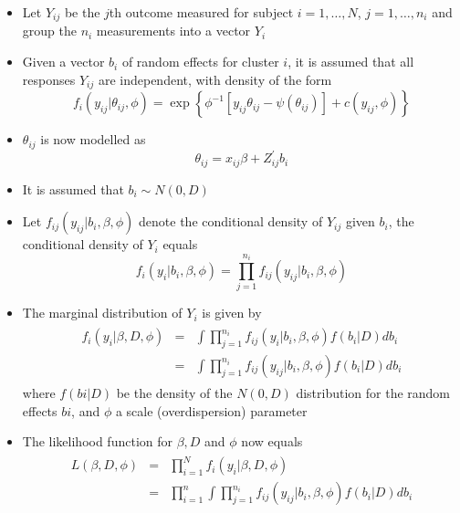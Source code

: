 \documentclass{beamer}
\begin{document}
\begin{frame}
\begin{itemize}
\item Let $Y_{ij}$ be the $j$th outcome measured for subject $i=1, \ldots, N$,   $j=1, \ldots, n_i$ and group the $n_i$ measurements into a vector $Y_i$
\item Given a vector $b_i$ of random effects for cluster $i$, it is assumed that all responses $Y_{ij}$ are independent, with density of the form
\begin{equation}
f_i(y_{ij}| \theta_{ij}, \phi)=\exp\left\{\phi^{-1}[y_{ij} \theta_{ij} -\psi(\theta_{ij})]+c(y_{ij},\phi) \right\}\nonumber
\end{equation}
\item $\theta_{ij}$ is now modelled as 
\[\theta_{ij}=x_{ij}\beta + Z^{'}_{ij}b_i \]
\item It is assumed that $b_i\sim N(0, D)$
\end{itemize}
\end{frame}

\begin{frame}
\begin{itemize}
\item Let $f_{ij}(y_{ij}|b_i,\beta,\phi)$ denote the conditional density of $Y_{ij}$ given $b_i$, the conditional density of $Y_i$ equals 
\[f_{i}(y_{i}|b_i,\beta,\phi)=\prod_{j=1}^{n_i}f_{ij}(y_{ij}|b_i,\beta,\phi) \]
\item The marginal distribution of $Y_i$ is given by
\begin{eqnarray*}
	\begin{array}{lll}
f_i(y_i|\beta,D,\phi)&=&\int\prod_{j=1}^{n_i}f_{ij}(y_i|b_i,\beta,\phi)f(b_i|D)db_i\\
                     &=&\int\prod_{j=1}^{n_i}f_{ij}(y_{ij}|b_i,\beta,\phi)f(b_i|D)db_i
\end{array}
\end{eqnarray*}
where $f(bi | D)$ be the density of the $N(0, D)$ distribution for the random effects $bi$, and $\phi$ a scale (overdispersion) parameter
\item The likelihood function for $\beta, D$ and $\phi$ now equals
\begin{eqnarray*}
	\begin{array}{lll}
		L(\beta,D,\phi)&=&\prod_{i=1}^{N}f_i(y_i|\beta,D,\phi)\\
		&=&\prod_{i=1}^{n}\int\prod_{j=1}^{n_i}f_{ij}(y_{ij}|b_i,\beta,\phi)f(b_i|D)db_i
	\end{array}
\end{eqnarray*}
\end{itemize}
\end{frame}
 
\end{document}
